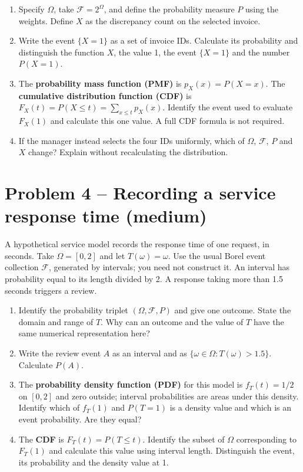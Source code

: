 \documentclass[11pt,a4paper]{article}
\begin{document}
\begin{enumerate}
\item Specify $\Omega$, take $\mathcal F=2^\Omega$, and define the probability measure $P$ using the weights. Define $X$ as the discrepancy count on the selected invoice.
\item Write the event $\{X=1\}$ as a set of invoice IDs. Calculate its probability and distinguish the function $X$, the value 1, the event $\{X=1\}$ and the number $P(X=1)$.
\item The \textbf{probability mass function (PMF)} is $p_X(x)=P(X=x)$. The \textbf{cumulative distribution function (CDF)} is $F_X(t)=P(X\le t)=\sum_{x\le t}p_X(x)$. Identify the event used to evaluate $F_X(1)$ and calculate this one value. A full CDF formula is not required.
\item If the manager instead selects the four IDs uniformly, which of $\Omega$, $\mathcal F$, $P$ and $X$ change? Explain without recalculating the distribution.
\end{enumerate}

\section*{Problem 4 -- Recording a service response time (medium)}

A hypothetical service model records the response time of one request, in seconds. Take $\Omega=[0,2]$ and let $T(\omega)=\omega$. Use the usual Borel event collection $\mathcal F$, generated by intervals; you need not construct it. An interval has probability equal to its length divided by 2. A response taking more than 1.5 seconds triggers a review.

\begin{enumerate}
\item Identify the probability triplet $(\Omega,\mathcal F,P)$ and give one outcome. State the domain and range of $T$. Why can an outcome and the value of $T$ have the same numerical representation here?
\item Write the review event $A$ as an interval and as $\{\omega\in\Omega:T(\omega)>1.5\}$. Calculate $P(A)$.
\item The \textbf{probability density function (PDF)} for this model is $f_T(t)=1/2$ on $[0,2]$ and zero outside; interval probabilities are areas under this density. Identify which of $f_T(1)$ and $P(T=1)$ is a density value and which is an event probability. Are they equal?
\item The \textbf{CDF} is $F_T(t)=P(T\le t)$. Identify the subset of $\Omega$ corresponding to $F_T(1)$ and calculate this value using interval length. Distinguish the event, its probability and the density value at 1.
\end{enumerate}
\end{document}
